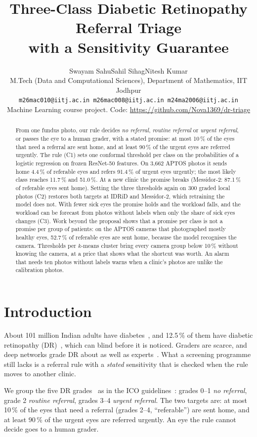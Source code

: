 \documentclass[10pt,twocolumn,letterpaper]{article}
\title{Three-Class Diabetic Retinopathy Referral Triage\\with a Sensitivity Guarantee}
\author{Swayam Sahu\qquad Sahil Sihag\qquad Nitesh Kumar\\
M.Tech (Data and Computational Sciences), Department of Mathematics, IIT Jodhpur\\
{\tt\small m26mac010@iitj.ac.in \quad m26mac008@iitj.ac.in \quad m24ma2006@iitj.ac.in}\\
{\small Machine Learning course project. Code: \url{https://github.com/Nova1369/dr-triage}}}
\newcommand{\pct}{\,\%}
\begin{document}
\maketitle

\begin{abstract}
From one fundus photo, our rule decides \emph{no referral}, \emph{routine referral} or \emph{urgent referral}, or passes the eye to a human grader, with a stated promise: at most 10\pct{} of the eyes that need a referral are sent home, and at least 90\pct{} of the urgent eyes are referred urgently. The rule (C1) sets one conformal threshold per class on the probabilities of a logistic regression on frozen ResNet-50 features. On 3,662 APTOS photos it sends home 4.4\pct{} of referable eyes and refers 91.4\pct{} of urgent eyes urgently; the most likely class reaches 11.7\pct{} and 51.0\pct. At a new clinic the promise breaks (Messidor-2: 87.1\pct{} of referable eyes sent home). Setting the three thresholds again on 300 graded local photos (C2) restores both targets at IDRiD and Messidor-2, which retraining the model does not. With fewer sick eyes the promise holds and the workload falls, and the workload can be forecast from photos without labels when only the share of sick eyes changes (C3). Work beyond the proposal shows that a promise per class is not a promise per group of patients: on the APTOS cameras that photographed mostly healthy eyes, 52.7\pct{} of referable eyes are sent home, because the model recognises the camera. Thresholds per $k$-means cluster bring every camera group below 10\pct{} without knowing the camera, at a price that shows what the shortcut was worth. An alarm that needs ten photos without labels warns when a clinic's photos are unlike the calibration photos.
\end{abstract}

\section{Introduction}
About 101 million Indian adults have diabetes~\cite{indiab}, and 12.5\pct{} of them have diabetic retinopathy (DR)~\cite{smart}, which can blind before it is noticed. Graders are scarce, and deep networks grade DR about as well as experts~\cite{gulshan16,gulshan19}. What a screening programme still lacks is a referral rule with a \emph{stated} sensitivity that is checked when the rule moves to another clinic.

We group the five DR grades~\cite{wilkinson} as in the ICO guidelines~\cite{ico}: grades 0--1 \emph{no referral}, grade 2 \emph{routine referral}, grades 3--4 \emph{urgent referral}. The two targets are: at most 10\pct{} of the eyes that need a referral (grades 2--4, ``referable'') are sent home, and at least 90\pct{} of the urgent eyes are referred urgently. An eye the rule cannot decide goes to a human grader.
\end{document}
